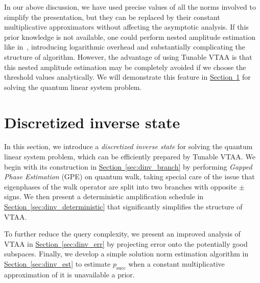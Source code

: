 \documentclass[letterpaper,onecolumn,11pt,accepted=2026-02-14]{quantumarticle}
\theoremstyle{remark}
\theoremstyle{plain}
\renewcommand{\sec}[1]{\hyperref[sec:#1]{Section~\ref*{sec:#1}}}
\begin{document}
In our above discussion, we have used precise values of all the norms involved to simplify the presentation, but they can be replaced by their constant multiplicative approximators without affecting the asymptotic analysis. 
If this prior knowledge is not available, one could perform nested amplitude estimation like in~\cite{Ambainis2012VTAA,Chakraborty2018BlockEncoding}, introducing logarithmic overhead and substantially complicating the structure of algorithm.
However, the advantage of using Tunable VTAA is that this nested amplitude estimation may be completely avoided if we choose the threshold values analytically. We will demonstrate this feature in \sec{dinv} for solving the quantum linear system problem.

\section{Discretized inverse state}
\label{sec:dinv}

In this section, we introduce a \emph{discretized inverse state} for solving the quantum linear system problem, which can be efficiently prepared by Tunable VTAA. We begin with its construction in \sec{dinv_branch} by performing \emph{Gapped Phase Estimation} (GPE) on quantum walk, taking special care of the issue that eigenphases of the walk operator are split into two branches with opposite $\pm$ signs. We then present a deterministic amplification schedule in \sec{dinv_deterministic} that significantly simplifies the structure of VTAA.

To further reduce the query complexity, we present an improved analysis of VTAA in \sec{dinv_err} by projecting error onto the potentially good subspaces. Finally, we develop a simple solution norm estimation algorithm in \sec{dinv_est} to estimate $p_{\text{succ}}$ when a constant multiplicative approximation of it is unavailable a prior.

\end{document}
